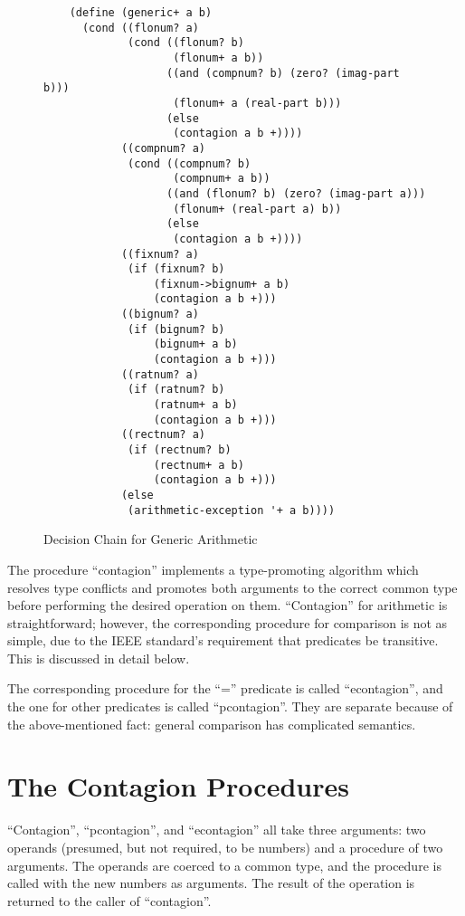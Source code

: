 \begin{figure}[hbt]
\begin{verbatim}
    (define (generic+ a b)
      (cond ((flonum? a)
             (cond ((flonum? b) 
                    (flonum+ a b))
                   ((and (compnum? b) (zero? (imag-part b)))
                    (flonum+ a (real-part b)))
                   (else
                    (contagion a b +))))
            ((compnum? a)
             (cond ((compnum? b)
                    (compnum+ a b))
                   ((and (flonum? b) (zero? (imag-part a)))
                    (flonum+ (real-part a) b))
                   (else
                    (contagion a b +))))
            ((fixnum? a)
             (if (fixnum? b)
                 (fixnum->bignum+ a b)
                 (contagion a b +)))
            ((bignum? a)
             (if (bignum? b)
                 (bignum+ a b)
                 (contagion a b +)))
            ((ratnum? a)
             (if (ratnum? b)
                 (ratnum+ a b)
                 (contagion a b +)))
            ((rectnum? a)
             (if (rectnum? b)
                 (rectnum+ a b)
                 (contagion a b +)))
            (else
             (arithmetic-exception '+ a b))))
\end{verbatim}
\caption{Decision Chain for Generic Arithmetic}
\label{chain}
\end{figure}

The procedure ``contagion'' implements a type-promoting algorithm
which resolves type conflicts and promotes both arguments to the
correct common type before performing the desired operation on them.
``Contagion'' for arithmetic is straightforward; however, the
corresponding procedure for comparison is not as simple, due to the
IEEE standard's requirement that predicates be transitive. This is
discussed in detail below.

The corresponding procedure for the ``='' predicate is called
``econtagion'', and the one for other predicates is called
``pcontagion''. They are separate because of the above-mentioned fact:
general comparison has complicated semantics.

\section{The Contagion Procedures}

``Contagion'', ``pcontagion'', and ``econtagion'' all take three arguments:
two operands (presumed, but not required, to be numbers) and a procedure of
two arguments. The operands are coerced to a common type, and the procedure
is called with the new numbers as arguments. The result of the operation is
returned to the caller of ``contagion''.

